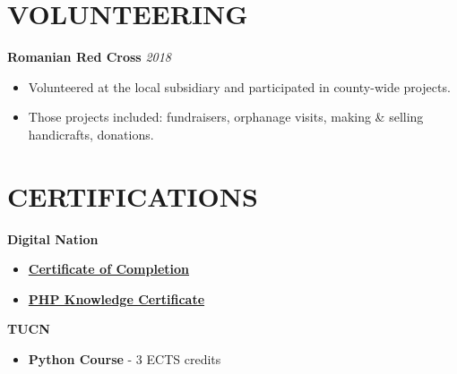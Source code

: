 \documentclass[margin]{res}
\begin{document}
\begin{resume}
  \section{VOLUNTEERING}
  \hspace{4mm}
  {\bf Romanian Red Cross} \hfill \textit{2018}
  \begin{itemize}
    \item Volunteered at the local subsidiary and participated in county-wide projects.
    \item Those projects included: fundraisers, orphanage visits, making \& selling handicrafts, donations.
  \end{itemize}

  \section{CERTIFICATIONS}
  \hspace{4mm}
  {\bf Digital Nation}
  \begin{itemize}
    \item \href{https://drive.google.com/file/d/15JN-Ko_CXP_WKGsrRxdQNzniaNkSrgTx/view}{\textbf{Certificate of Completion}}
    \item \href{https://drive.google.com/file/d/1Ahga9TNBsfRH_j3DBIsywD5D3XRbzElf/view}{\textbf{PHP Knowledge Certificate}}
  \end{itemize}
  \hspace{4mm}
  {\bf TUCN}
  \begin{itemize}
    \item {\textbf{Python Course}} - 3 ECTS credits
  \end{itemize}
\end{resume}
\end{document}
